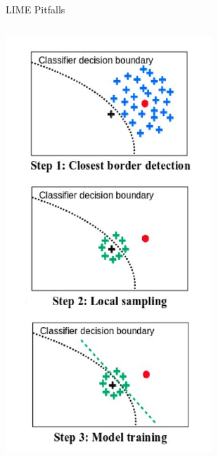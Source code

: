 \documentclass[aspectratio=169]{../latex_main/tntbeamer}  %
\begin{document}
\begin{frame}{LIME Pitfalls }
\begin{columns}
\begin{column}{0.2\textwidth}
			\vspace{-0.2cm}
		\includegraphics[width=1.\textwidth]{figure/lime_bordersample2}
		
 	\end{column}
\end{columns}

\end{frame}
\end{document}
